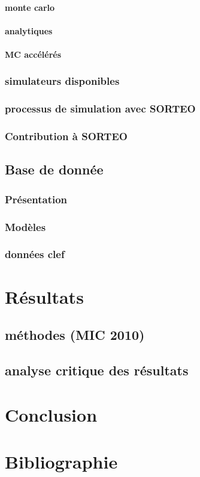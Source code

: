 \documentclass[12pt]{book}
\begin{document}
			\subsection{monte carlo}
			\subsection{analytiques}
			\subsection{MC accélérés}

		\section{simulateurs disponibles}
		\section{processus de simulation avec SORTEO}
		\section{Contribution à SORTEO}

	\chapter{Base de donnée}
		\section{Présentation}
		\section{Modèles}
		\section{données clef} %


\part{Résultats}
	\chapter{méthodes (MIC 2010)}
        \chapter{analyse critique des résultats}

\part{Conclusion}




\part{Bibliographie}


\end{document}
